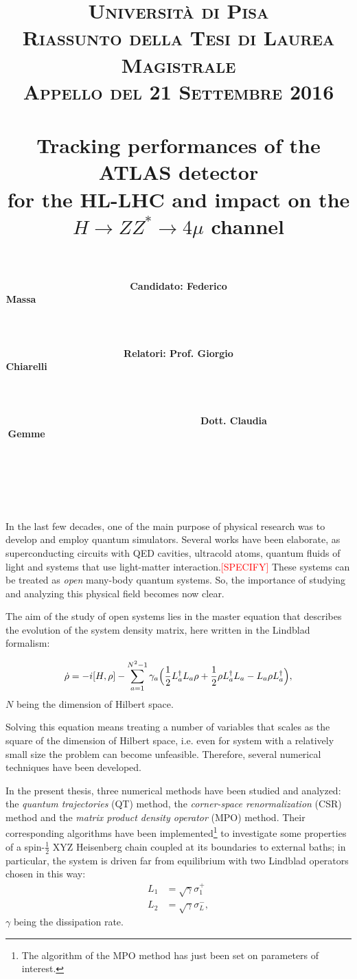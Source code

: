 \documentclass[paper=a4, fontsize=11pt]{scrartcl}	%
\title{
		\usefont{OT1}{bch}{b}{n}
		\normalfont \normalsize \textsc{Universit\`a di Pisa} \\[1ex]
		\normalfont \normalsize \textsc{Riassunto della Tesi di Laurea Magistrale}\\ 
		\normalfont \normalsize \textsc{Appello del 21 Settembre 2016}\\ [25pt]
		\horrule{0.5pt} \\[0.4cm]
		\huge  Tracking performances of the ATLAS detector \\
			for the HL-LHC and impact on the \\
			$H\rightarrow ZZ^{*}\rightarrow 4\mu$ channel\\
		\horrule{2pt} \\[0.0cm]
}
\author{
		\normalfont 								\normalsize
        \textbf{Candidato: Federico Massa\ \ \ \ \ \ \ \ \ \ \ \ \ \ \ \ \ \ \ \ \ \ \ \ \ \ \ \ \ \ \ \ \ \ \ \ \ \ \ \ \ \ \ \ \ \ \ \ \ \ \ \ \ \ \ \ \ \ \ \ \ \ \ \ \ \ \ \ \ \ \ \ \ \ \ \ \ \ \ \ \ \ \ \ \ \ \ \ \ \ \ \ \ \ \ \ \ \ \ \ \ \ \ \ \ \ \ \ \ \ \ \ \ \ \ \ \ \ \ \ \ \ \ \ \ \ \ \ \ \ \ \ \ \ \ \ \ \ \ \ \ \ \ \ \ \ \ \ \ \ \ \ \ \ \ \ \ \ \ \ \ \ \ \ \ \ \ \ \ \ \ \ \ \ \ \ \ \ \ \ \ \ \ \ \ \ \ \ \ \ \ \ \ \ \ \ \ \ \ \ \ \ \ \ \ \ \ \ \ \ \ \ \ \ \ \ \ \ \ \ \ \ \ \ } \\[-3pt]		\normalsize
        \textbf{Relatori: Prof. Giorgio Chiarelli\ \ \ \ \ \ \ \ \ \ \ \ \ \ \ \ \ \ \ \ \ \ \ \ \ \ \ \ \ \ \ \ \ \ \ \ \ \ \ \ \ \ \ \ \ \ \ \ \ \ \ \ \ \ \ \ \ \ \ \ \ \ \ \ \ \ \ \ \ \ \ \ \ \ \ \ \ \ \ \ \ \ \ \ \ \ \ \ \ \ \ \ \ \ \ \ \ \ \ \ \ \ \ \ \ \ \ \ \ \ \ \ \ \ \ \ \ \ \ \ \ \ \ \ \ \ \ \ \ \ \ \ \ \ \ \ \ \ \ \ \ \ \ \ \ \ \ \ \ \ \ \ \ \ \ \ \ \ \ \ \ \ \ \ \ \ \ \ \ \ \ \ \ \ \ \ \ \ \ \ \ \ \ \ \ \ \ \ \ \ \ \ \ \ \ \ \ \ \ \ \ \ \ \ \ \ \ \ \ \ \ \ \ \ } \\ [-3pt]\normalsize
        \textbf{\ \ \ \ \ \ \ \ \ \ \ \ \ \ \ \ \ \ \ \ Dott. Claudia Gemme\ \ \ \ \ \ \ \ \ \ \ \ \ \ \ \ \ \ \ \ \ \ \ \ \ \ \ \ \ \ \ \ \ \ \ \ \ \ \ \ \ \ \ \ \ \ \ \ \ \ \ \ \ \ \ \ \ \ \ \ \ \ \ \ \ \ \ \ \ \ \ \ \ \ \ \ \ \ \ \ \ \ \ \ \ \ \ \ \ \ \ \ \ \ \ \ \ \ \ \ \ \ \ \ \ \ \ \ \ \ \ \ \ \ \ \ \ \ \ \ \ \ \ \ \ \ \ \ \ \ \ \ \ \ \ \ \ \ \ \ \ \ \ \ \ \ \ \ \ \ \ \ \ \ \ \ \ \ \ \ \ \ \ \ \ \ \ \ \ \ \ \ \ \ \ \ \ \ \ \ \ \ \ \ \ \ \ \ \ \ \ \ \ \ \ \ \ \ \ \ \ \ \ \ \ \ \ \ \ \ \ \ \ \ }
}
\date{}
\numberwithin{equation}{section}		%
\numberwithin{figure}{section}			%
\numberwithin{table}{section}				%
\begin{document}
\maketitle

In the last few decades, one of the main purpose of physical research was to develop and employ quantum simulators. Several works have been elaborate, as superconducting circuits with QED cavities, ultracold atoms, quantum fluids of light and systems that use light-matter interaction.\textcolor{red}{[SPECIFY]} These systems can be treated as \emph{open} many-body quantum systems. So, the importance of studying and analyzing this physical field becomes now clear. 

The aim of the study of open systems lies in the master equation that describes the evolution of the system density matrix, here written in the Lindblad formalism:

\begin{equation*}
    \dot{\rho} = -i[H, \rho] - \sum_{a=1}^{N^2-1} \gamma_a \Bigl(\frac{1}{2}L_a^{\dagger}L_a\rho + \frac{1}{2}\rho L_a^{\dagger}L_a - L_a\rho L_a^{\dagger}\Bigl),
\end{equation*}
$N$ being the dimension of Hilbert space.

Solving this equation means treating a number of variables that scales as the square of the dimension of Hilbert space, i.e. even for system with a relatively small size the problem can become unfeasible. Therefore, several numerical techniques have been developed.

In the present thesis, three numerical methods have been studied and analyzed:
the \emph{quantum trajectories} (QT) method, the \emph{corner-space renormalization} (CSR) method and the \emph{matrix product density operator} (MPO) method. Their corresponding algorithms have been implemented\footnote{The algorithm of the MPO method has just been set on parameters of interest.} to investigate some properties of a spin-$\frac{1}{2}$ XYZ Heisenberg chain coupled at its boundaries to external baths; in particular, the system is driven far from equilibrium with two Lindblad operators chosen in this way:
\begin{equation*}
\begin{split}
    L_1 &= \sqrt{\gamma} \sigma_1^+ \\
    L_2 &= \sqrt{\gamma}\sigma_L^-,
\end{split}
\end{equation*}
$\gamma$ being the dissipation rate. 
\end{document}
